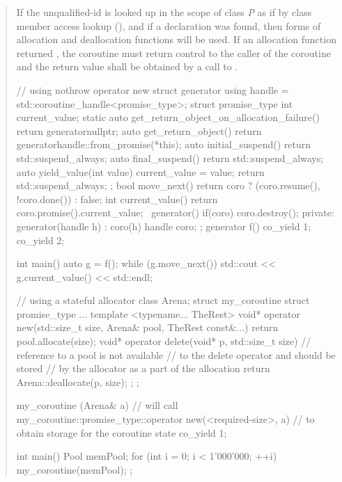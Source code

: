 \begin{quote}
\pnum
If the unqualified-id  is looked up in the scope of class \textit{P}
as if by class member access lookup (), and if a declaration was found,
 then  forms of allocation and deallocation functions will be used. If an allocation function returned , the coroutine must return control to the caller of the coroutine and the return value shall be obtained by a call to .

\enterexample
\begin{codeblock}
// using nothrow operator new
struct generator {
  using handle = std::coroutine_handle<promise_type>;
  struct promise_type {
    int current_value;
    static auto get_return_object_on_allocation_failure() { return generator{nullptr}; }
    auto get_return_object() { return generator{handle::from_promise(*this)}; }
    auto initial_suspend() { return std::suspend_always{}; }
    auto final_suspend() { return std::suspend_always{}; }
    auto yield_value(int value) { 
      current_value = value; 
      return std::suspend_always{};
    }
  };
  bool move_next() { return coro ? (coro.resume(), !coro.done()) : false; }
  int current_value() { return coro.promise().current_value; }
  ~generator() { if(coro) coro.destroy(); }
private:
  generator(handle h) : coro(h) {}
  handle coro;
};
generator f() { co_yield 1;  co_yield 2; }
 
int main() {
  auto g = f();
  while (g.move_next()) std::cout << g.current_value() << std::endl;
}

\end{codeblock}
\exitexample

\pnum
\enterexample
\begin{codeblock}
  // using a stateful allocator
  class Arena;
  struct my_coroutine {
    struct promise_type {
      ...
      template <typename... TheRest>
      void* operator new(std::size_t size, Arena& pool, TheRest const&...) {
        return pool.allocate(size);
      }
      void* operator delete(void* p, std::size_t size) {
      	// reference to a pool is not available
      	// to the delete operator and should be stored
      	// by the allocator as a part of the allocation
        return Arena::deallocate(p, size);
      }
    };
  };
  
  my_coroutine (Arena& a) {
    // will call my_coroutine::promise_type::operator new(<required-size>, a)
    // to obtain storage for the coroutine state
    co_yield 1;
  }
  
  int main() {
    Pool memPool;
    for (int i = 0; i < 1'000'000; ++i) my_coroutine(memPool);
  };
\end{codeblock}
\exitexample
\end{quote}